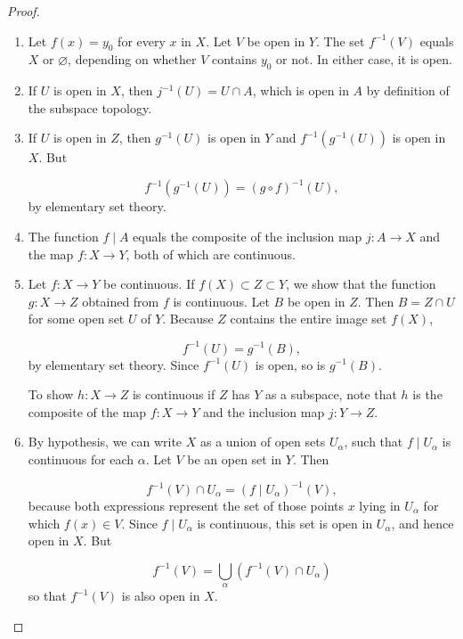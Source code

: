 \begin{proof}
 \begin{enumerate}[itemsep=0.2em, parsep=0pt, topsep=0pt, partopsep=0pt, leftmargin=*, label=(\alph*), align=left]
 \item Let \(f(x) = y_{0}\) for every \(x\) in \(X\). Let \(V\) be open in \(Y\). The set \(f^{-1}( V)\) equals \(X\) or \(\varnothing\), depending on whether \(V\) contains \(y_{0}\) or not. In either case, it is open.

 \item If \(U\) is open in \(X\), then \(j^{-1}( U) = U \cap A\), which is open in \(A\) by definition of the subspace topology.

 \item If \(U\) is open in \(Z\), then \(g^{-1}( U)\) is open in \(Y\) and \(f^{-1}( {g^{-1}( U) })\) is open in \(X\). But

 \[
 f^{-1}( {g^{-1}( U) }) = {( g \circ f) }^{-1}( U),
 \]
 by elementary set theory.

 \item The function \(f \mid A\) equals the composite of the inclusion map \(j : A \rightarrow X\) and the map \(f : X \rightarrow Y\), both of which are continuous.

 \item Let \(f : X \rightarrow Y\) be continuous. If \(f( X) \subset Z \subset Y\), we show that the function \(g : X \rightarrow Z\) obtained from \(f\) is continuous. Let \(B\) be open in \(Z\). Then \(B = Z \cap U\) for some open set \(U\) of \(Y\). Because \(Z\) contains the entire image set \(f( X)\),

 \[
 f^{-1}( U) = g^{-1}( B),
 \]
 by elementary set theory. Since \(f^{-1}( U)\) is open, so is \(g^{-1}( B)\).

 To show \(h : X \rightarrow Z\) is continuous if \(Z\) has \(Y\) as a subspace, note that \(h\) is the composite of the map \(f : X \rightarrow Y\) and the inclusion map \(j : Y \rightarrow Z\).

 \item By hypothesis, we can write \(X\) as a union of open sets \(U_{\alpha }\), such that \(f \mid {U}_{\alpha }\) is continuous for each \(\alpha\). Let \(V\) be an open set in \(Y\). Then

 \[
 f^{-1}( V) \cap {U}_{\alpha } = {( f \mid {U}_{\alpha }) }^{-1}( V),
 \]
 because both expressions represent the set of those points \(x\) lying in \(U_{\alpha }\) for which \(f(x) \in V\). Since \(f \mid {U}_{\alpha }\) is continuous, this set is open in \(U_{\alpha }\), and hence open in \(X\). But

 \[
 f^{-1}( V) = \mathop{\bigcup }\limits_{\alpha }( {f^{-1}( V) \cap {U}_{\alpha }})
 \]
 so that \(f^{-1}( V)\) is also open in \(X\).
 \end{enumerate}
\end{proof}

